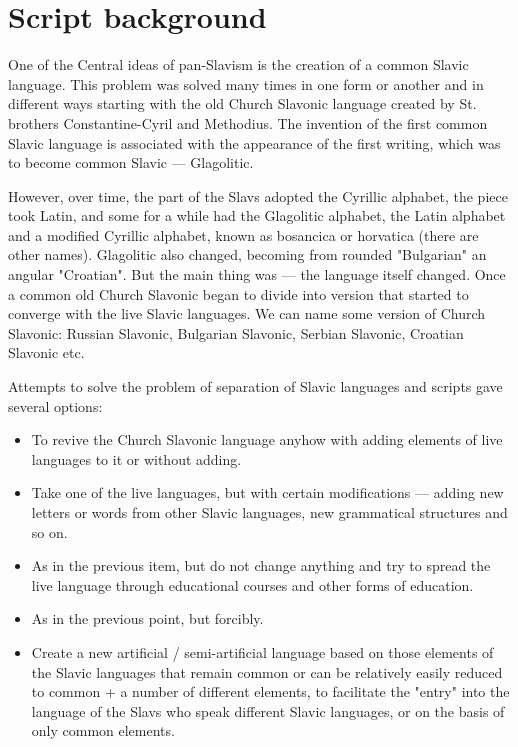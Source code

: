 \section{Script background}

One of the Central ideas of pan-Slavism is the creation of a common Slavic language. This problem was solved many times in one form or another and in different ways starting with the old Church Slavonic language created by St. brothers Constantine-Cyril and Methodius. The invention of the first common Slavic language is associated with the appearance of the first writing, which was to become common Slavic — Glagolitic.

However, over time, the part of the Slavs adopted the Cyrillic alphabet, the piece took Latin, and some for a while had the Glagolitic alphabet, the Latin alphabet and a modified Cyrillic alphabet, known as bosancica or horvatica (there are other names). Glagolitic also changed, becoming from rounded "Bulgarian" an angular "Croatian". But the main thing was — the language itself changed. Once a common old Church Slavonic began to divide into version that started to converge with the live Slavic languages. We can name some version of Church Slavonic: Russian Slavonic, Bulgarian Slavonic, Serbian Slavonic, Croatian Slavonic etc.

Attempts to solve the problem of separation of Slavic languages and scripts gave several options:

\begin{itemize}
	\item To revive the Church Slavonic language anyhow with adding elements of live languages to it or without adding.
	\item Take one of the live languages, but with certain modifications — adding new letters or words from other Slavic languages, new grammatical structures and so on.
	\item As in the previous item, but do not change anything and try to spread the live language through educational courses and other forms of education.
	\item As in the previous point, but forcibly.
	\item Create a new artificial / semi-artificial language based on those elements of the Slavic languages that remain common or can be relatively easily reduced to common + a number of different elements, to facilitate the "entry" into the language of the Slavs who speak different Slavic languages, or on the basis of only common elements.
\end{itemize}

